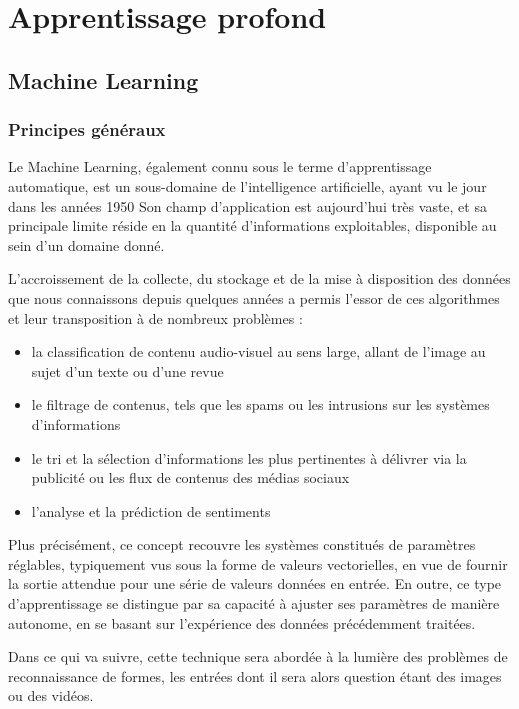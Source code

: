 \chapter{Apprentissage profond}

  \section{Machine Learning}

    \subsection{Principes généraux}

      Le Machine Learning, également connu sous le terme d'apprentissage automatique, est un sous-domaine de l'intelligence artificielle, ayant vu le jour dans
      les années 1950\cite{Bib_Marr}\cite{Bib_McCar}
      Son champ d'application est aujourd'hui très vaste, et sa principale limite réside en la quantité d'informations exploitables, disponible au sein d'un domaine donné.

      L'accroissement de la collecte, du stockage et de la mise à disposition des données que nous connaissons depuis quelques années a permis l'essor de ces algorithmes et leur transposition à de nombreux problèmes :

      \begin{itemize}
	\item la classification de contenu audio-visuel au sens large, allant de l'image au sujet d'un texte ou d'une revue
	\item le filtrage de contenus, tels que les spams ou les intrusions sur les systèmes d'informations
	\item le tri et la sélection d'informations les plus pertinentes à délivrer via la publicité ou les flux de contenus des médias sociaux
	\item l'analyse et la prédiction de sentiments
      \end{itemize}

      Plus précisément, ce concept recouvre les systèmes constitués de paramètres réglables, typiquement vus sous la forme de
      valeurs vectorielles, en vue de fournir la sortie attendue pour une série de valeurs données en entrée. En outre, ce type d'apprentissage se distingue
      par sa capacité à ajuster ses paramètres de manière autonome, en se basant sur l'expérience des données précédemment traitées.

      Dans ce qui va suivre, cette technique sera abordée à la lumière des problèmes de reconnaissance de formes, les entrées dont il sera alors question étant des images ou des vidéos.

